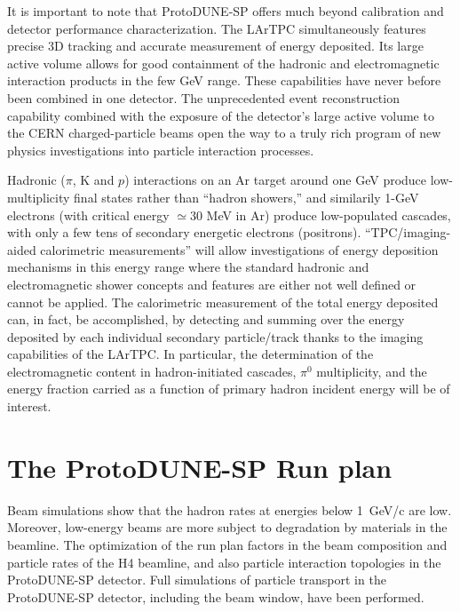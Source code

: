 {It is important to note that ProtoDUNE-SP offers much beyond calibration  and detector performance characterization.  The LArTPC simultaneously features precise 3D tracking and accurate measurement of energy deposited. Its large active volume allows for good containment of the hadronic and electromagnetic interaction products in the few GeV range. These capabilities have never before been combined in one detector.  The unprecedented event reconstruction capability combined with the exposure of the detector's large active volume to the CERN charged-particle beams open the way to a truly rich program of new physics investigations into particle interaction processes. 

  Hadronic ($\pi$, K and $p$) interactions on an Ar target around one GeV produce low-multiplicity final states rather than ``hadron showers,'' and similarily 1-GeV electrons  (with critical energy $\simeq 30$ MeV in Ar) produce low-populated cascades, with only a few tens of secondary energetic electrons (positrons).
``TPC/imaging-aided calorimetric measurements'' will allow investigations of energy deposition mechanisms in this energy range where the standard hadronic and electromagnetic shower concepts and features are either not well defined or cannot be applied.
The calorimetric measurement of the total energy deposited can, in fact, be accomplished, by detecting and summing over the energy deposited by each individual secondary particle/track thanks to the imaging capabilities of the LArTPC.
In particular, the determination of the electromagnetic  content in hadron-initiated cascades, $\pi^0$ multiplicity, and the energy fraction carried as a function of primary hadron incident energy will be of interest.

\section{The ProtoDUNE-SP Run plan}
\label{sec:runplan}


Beam simulations show that the hadron rates at 
energies below 1~GeV/c are low. Moreover, low-energy beams are more
subject to degradation by materials in the
beamline.  The optimization of the run plan factors in the beam composition and particle rates of the H4 beamline, and 
also particle interaction topologies in the ProtoDUNE-SP detector. Full 
simulations of particle transport in the ProtoDUNE-SP detector, including the
beam window, have been performed.


}
